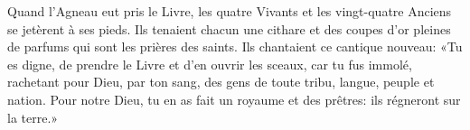 Quand l’Agneau eut pris le Livre,
	les quatre Vivants et les vingt-quatre Anciens se jetèrent à ses pieds.
Ils tenaient chacun une cithare
	et des coupes d’or pleines de parfums qui sont les prières des saints.
Ils chantaient ce cantique nouveau:
	«Tu es digne, de prendre le Livre et d’en ouvrir les sceaux,
	car tu fus immolé, rachetant pour Dieu, par ton sang,
	des gens de toute tribu, langue, peuple et nation.
Pour notre Dieu, tu en as fait un royaume et des prêtres:
	ils régneront sur la terre.»
